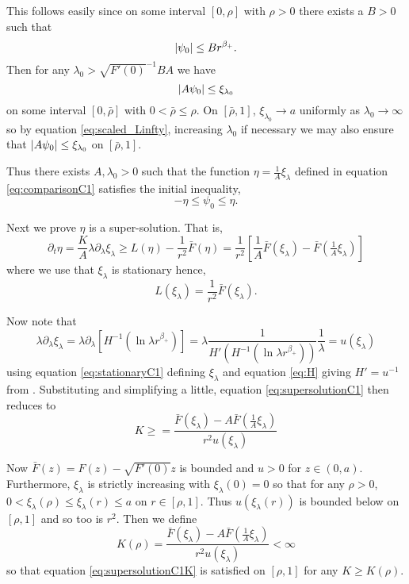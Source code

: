 \documentclass{amsart}
\begin{document}
This follows easily since on some interval \([0, \rho]\) with \(\rho > 0\) there exists a \(B > 0\) such that
\[
\left|{\psi_0}\right| \leq B r^{\beta_+}.
\]
Then for any \(\lambda_0 > \sqrt{F'(0)}^{-1} B A\) we have
\[
\left|{A \psi_0}\right| \leq \xi_{\lambda_0}
\]
on some interval \([0, \bar{\rho}]\) with \(0 < \bar{\rho} \leq \rho\). On \([\bar{\rho}, 1]\), \(\xi_{\lambda_0} \to a\) uniformly as \(\lambda_0 \to \infty\) so by equation \eqref{eq:scaled_Linfty}, increasing \(\lambda_0\) if necessary we may also ensure that \(\left|{A \psi_0}\right| \leq \xi_{\lambda_0}\) on \([\bar{\rho}, 1]\).

Thus there exists \(A, \lambda_0 > 0\) such that the function \(\eta = \tfrac{1}{A} \xi_{\lambda}\) defined in equation \eqref{eq:comparisonC1} satisfies the initial inequality,
\[
-\eta \leq \psi_0 \leq \eta.
\]

Next we prove \(\eta\) is a super-solution. That is,
\begin{equation}
\label{eq:supersolutionC1}
\partial_t \eta = \frac{K}{A} \lambda \partial_{\lambda} \xi_{\lambda} \geq L(\eta) - \frac{1}{r^2} \bar{F}(\eta) = \frac{1}{r^2} \left[\frac{1}{A} \bar{F}(\xi_{\lambda}) - \bar{F}\left(\tfrac{1}{A} \xi_{\lambda}\right)\right]
\end{equation}
where we use that \(\xi_{\lambda}\) is stationary hence,
\[
L(\xi_{\lambda}) = \frac{1}{r^2} \bar{F}(\xi_{\lambda}).
\]

Now note that
\[
\lambda \partial_{\lambda} \xi_{\lambda} = \lambda \partial_{\lambda} [H^{-1}(\ln \lambda r^{\beta_+})] = \lambda \frac{1}{H'(H^{-1} (\ln \lambda r^{\beta_+}))} \frac{1}{\lambda} = u(\xi_{\lambda})
\]
using equation \eqref{eq:stationaryC1} defining \(\xi_{\lambda}\) and equation \eqref{eq:H} giving \(H' = u^{-1}\) from . Substituting and simplifying a little, equation \eqref{eq:supersolutionC1} then reduces to
\begin{equation}
\label{eq:supersolutionC1K}
K \geq = \frac{\bar{F}(\xi_{\lambda}) - A \bar{F}\left(\tfrac{1}{A} \xi_{\lambda}\right)}{r^{2}u(\xi_{\lambda})}
\end{equation}

Now \(\bar{F}(z) = F(z) - \sqrt{F'(0)} z\) is bounded and \(u > 0\) for \(z \in (0, a)\). Furthermore, \(\xi_{\lambda}\) is strictly increasing with \(\xi_{\lambda}(0) = 0\) so that for any \(\rho>0\), \(0 < \xi_{\lambda}(\rho) \leq \xi_{\lambda}(r) \leq a\) on \(r \in [\rho, 1]\). Thus \(u(\xi_{\lambda} (r))\) is bounded below on \([\rho, 1]\) and so too is \(r^{2}\). Then we define
\[
K(\rho) = \frac{\bar{F}(\xi_{\lambda}) - A \bar{F}\left(\tfrac{1}{A} \xi_{\lambda}\right)}{r^{2}u(\xi_{\lambda})} < \infty
\]
so that equation \eqref{eq:supersolutionC1K} is satisfied on \([\rho, 1]\) for any \(K \geq K(\rho)\).
\end{document}
